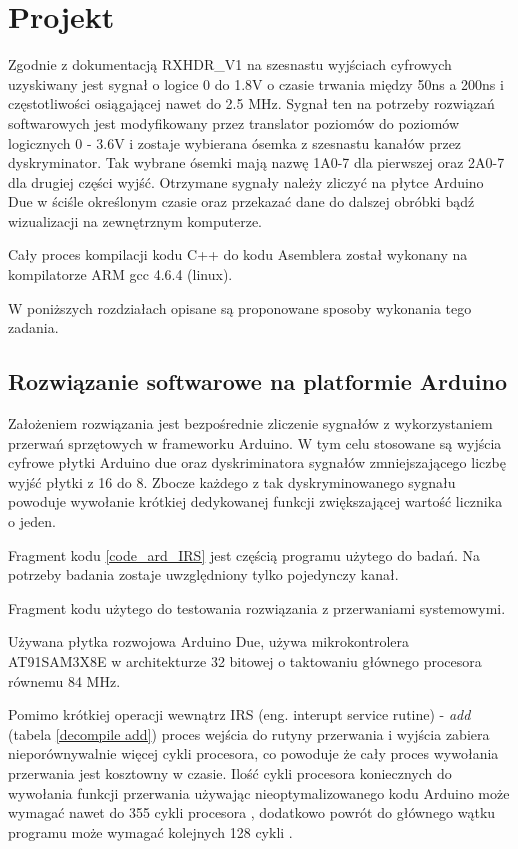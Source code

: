 \section{Projekt}

Zgodnie z dokumentacją RXHDR\_V1 \cite{master} na szesnastu wyjściach cyfrowych uzyskiwany jest sygnał o logice 0 do 1.8V o czasie trwania między 50ns a 200ns i częstotliwości osiągającej nawet do 2.5 MHz.
Sygnał ten na potrzeby rozwiązań softwarowych jest modyfikowany przez translator poziomów do poziomów logicznych 0 - 3.6V i zostaje wybierana ósemka z szesnastu kanałów przez dyskryminator.   
Tak wybrane ósemki mają nazwę 1A0-7 dla pierwszej oraz 2A0-7 dla drugiej części wyjść.   
Otrzymane sygnały należy zliczyć na płytce Arduino Due w ściśle określonym czasie oraz przekazać dane do dalszej obróbki bądź wizualizacji na zewnętrznym komputerze.

Cały proces kompilacji kodu C++ do kodu Asemblera został wykonany na kompilatorze ARM gcc 4.6.4 (linux). 

W poniższych rozdziałach opisane są proponowane sposoby wykonania tego zadania. 

\subsection{Rozwiązanie softwarowe na platformie Arduino}
\label{dzial arduino}
Założeniem rozwiązania jest bezpośrednie zliczenie sygnałów z wykorzystaniem przerwań sprzętowych w frameworku Arduino. W tym celu stosowane są wyjścia cyfrowe płytki Arduino due oraz dyskriminatora sygnałów zmniejszającego liczbę wyjść płytki z 16 do 8.
Zbocze każdego z tak dyskryminowanego sygnału  powoduje wywołanie krótkiej dedykowanej funkcji zwiększającej wartość licznika o jeden. 

Fragment kodu \ref{code_ard_IRS} jest częścią programu użytego do badań. Na potrzeby badania zostaje uwzględniony tylko pojedynczy kanał.

\begin{kod}
        
        \caption{Fragment kodu użytego do testowania rozwiązania z przerwaniami systemowymi.}
        \label{code_ard_IRS}
\end{kod}


Używana płytka rozwojowa Arduino Due, używa mikrokontrolera AT91SAM3X8E w architekturze 32 bitowej o taktowaniu głównego procesora równemu 84 MHz.

Pomimo krótkiej operacji wewnątrz IRS (eng. interupt service rutine) - \textit{add} (tabela \ref{decompile add}) proces wejścia do rutyny przerwania i wyjścia zabiera nieporównywalnie więcej cykli procesora, co powoduje że cały proces wywołania przerwania jest kosztowny w czasie. 
Ilość cykli procesora koniecznych do wywołania funkcji przerwania używając nieoptymalizowanego kodu Arduino może wymagać nawet do 355 cykli procesora \cite{ard_opt_git}, dodatkowo powrót do głównego wątku programu może wymagać kolejnych 128 cykli \cite{ard_opt_git}.

